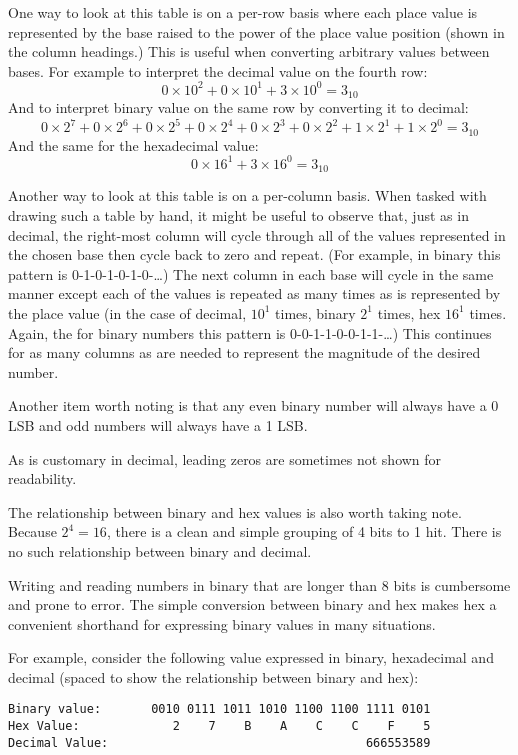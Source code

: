 One way to look at this table is on a per-row basis where each place 
value is represented by the base raised to the power of the place value
position (shown in the column headings.)  This is useful when
converting arbitrary values between bases.  For example to interpret
the decimal value on the fourth row: 
\[ 0 \times 10^2 + 0 \times 10^1 + 3 \times 10^0 = 3_{10} \]
And to interpret binary value on the same row by converting it to decimal:
\[ 0 \times 2^7 + 0 \times 2^6 +0 \times 2^5 +0 \times 2^4 +0 \times 2^3 +0 \times 2^2 + 1 \times 2^1 + 1 \times 2^0 = 3_{10} \]
And the same for the hexadecimal value:
\[ 0 \times 16^1 + 3 \times 16^0 = 3_{10} \]


Another way to look at this table is on a per-column basis.  When
tasked with drawing such a table by hand, it might be useful 
to observe that, just as in decimal, the right-most column will
cycle through all of the values represented in the chosen base
then cycle back to zero and repeat.  (For example, in binary this
pattern is 0-1-0-1-0-1-0-\ldots) The next column in each base
will cycle in the same manner except each of the values is repeated
as many times as is represented by the place value (in the case of 
decimal, $10^1$ times, binary $2^1$ times, hex $16^1$ times.  Again,
the for binary numbers this pattern is  0-0-1-1-0-0-1-1-\ldots)
This continues for as many columns as are needed to represent the 
magnitude of the desired number.

Another item worth noting is that any even binary number will always
have a 0 LSB and odd numbers will always have a 1 LSB.

As is customary in decimal, leading zeros are sometimes not shown 
for readability.

The relationship between binary and hex values is also worth taking
note.  Because $2^4 = 16$, there is a clean and simple grouping
of 4 \gls{bit}s to 1 \gls{hit}.  There is no such relationship
between binary and decimal.  

Writing and reading numbers in binary that are longer than 8 bits 
is cumbersome and prone to error.  The simple conversion between 
binary and hex makes hex a convenient shorthand for expressing 
binary values in many situations.  

For example, consider the following value expressed in binary, 
hexadecimal and decimal (spaced to show the relationship
between binary and hex):

\begin{verbatim}
Binary value:       0010 0111 1011 1010 1100 1100 1111 0101
Hex Value:             2    7    B    A    C    C    F    5
Decimal Value:                                    666553589
\end{verbatim}

